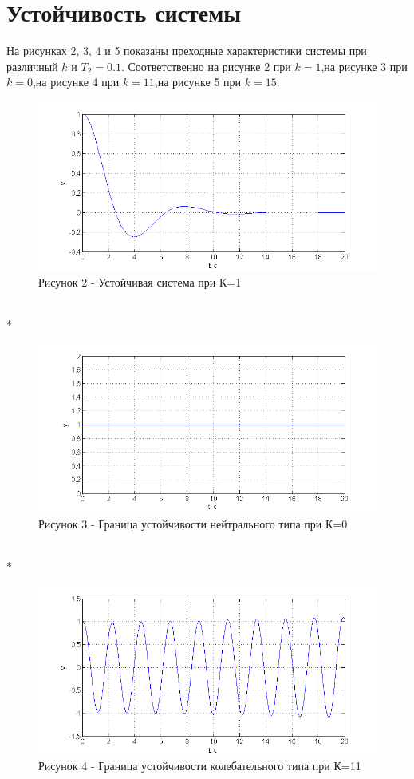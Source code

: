 \documentclass[a4paper, 12pt]{article}
\begin{document}
\section*{ Устойчивость системы}
На рисунках 2, 3, 4 и 5 показаны преходные характеристики системы при различный $k$ и $T_2 = 0.1$. Соответственно на рисунке 2 при $k = 1$,на рисунке 3  при $k = 0$,на рисунке 4 при $k = 11$,на рисунке 5 при $k = 15$. \\
\begin{figure}[h]
	\centering
	\includegraphics[width = 1\linewidth]{1.png} \\
  \centering Рисунок 2 - Устойчивая система при К=1
\end{figure} 
\hfill\\*
\newpage
\begin{figure}[h]
	\centering
	\includegraphics[width = 1\textwidth]{2.png} \\
  \centering Рисунок 3 - Граница устойчивости нейтрального типа при К=0
\end{figure}
\hfill\\* 
\begin{figure}[h!]
	\centering
	\includegraphics[width = 1\textwidth]{3.png} \\
  \centering Рисунок 4 - Граница устойчивости колебательного типа при К=11
\end{figure} 
\end{document}
